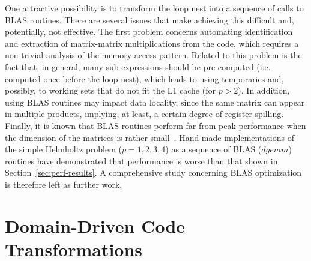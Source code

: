 \documentclass[conference]{IEEEtran}
\begin{document}
One attractive possibility is to transform the loop nest into a sequence of calls to BLAS routines. There are several issues that make achieving this difficult and, potentially, not effective. The first problem concerns automating identification and extraction of matrix-matrix multiplications from the code, which requires a non-trivial analysis of the memory access pattern. Related to this problem is the fact that, in general, many sub-expressions should be pre-computed (i.e. computed once before the loop nest), which leads to using temporaries and, possibly, to working sets that do not fit the L1 cache (for $p>2$). In addition, using BLAS routines may impact data locality, since the same matrix can appear in multiple products, implying, at least, a certain degree of register spilling. Finally, it is known that BLAS routines perform far from peak performance when the dimension of the matrices is rather small~\cite{nek5000}. Hand-made implementations of the simple Helmholtz problem ($p=1,2,3,4$) as a sequence of BLAS ($dgemm$) routines have demonstrated that performance is worse than that shown in Section~\ref{sec:perf-results}. A comprehensive study concerning BLAS optimization is therefore left as further work.


\section{Domain-Driven Code Transformations}
\label{sec:code-transf}
\end{document}
